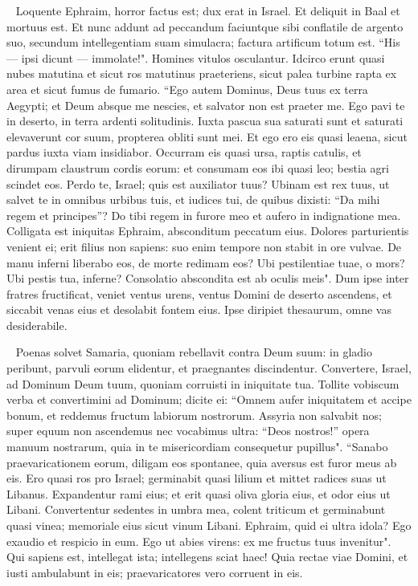 \begin{biblechapter}   
\verse Loquente Ephraim, horror factus est; dux erat in Israel. Et deliquit in Baal et mortuus est. 
\verse Et nunc addunt ad peccandum faciuntque sibi conflatile de argento suo, secundum intellegentiam suam simulacra; factura artificum totum est. “His — ipsi dicunt — immolate!". Homines vitulos osculantur. 
\verse Idcirco erunt quasi nubes matutina et sicut ros matutinus praeteriens, sicut palea turbine rapta ex area et sicut fumus de fumario. 
\verse “Ego autem Dominus, Deus tuus ex terra Aegypti; et Deum absque me nescies, et salvator non est praeter me. 
\verse Ego pavi te in deserto, in terra ardenti solitudinis. 
\verse Iuxta pascua sua saturati sunt et saturati elevaverunt cor suum, propterea obliti sunt mei. 
\verse Et ego ero eis quasi leaena, sicut pardus iuxta viam insidiabor. 
\verse Occurram eis quasi ursa, raptis catulis, et dirumpam claustrum cordis eorum: et consumam eos ibi quasi leo; bestia agri scindet eos. 
\verse Perdo te, Israel; quis est auxiliator tuus? 
\verse Ubinam est rex tuus, ut salvet te in omnibus urbibus tuis, et iudices tui, de quibus dixisti: “Da mihi regem et principes”? 
\verse Do tibi regem in furore meo et aufero in indignatione mea. 
\verse Colligata est iniquitas Ephraim, absconditum peccatum eius. 
\verse Dolores parturientis venient ei; erit filius non sapiens: suo enim tempore non stabit in ore vulvae. 
\verse De manu inferni liberabo eos, de morte redimam eos? Ubi pestilentiae tuae, o mors? Ubi pestis tua, inferne? Consolatio abscondita est ab oculis meis". 
\verse Dum ipse inter fratres fructificat, veniet ventus urens, ventus Domini de deserto ascendens, et siccabit venas eius et desolabit fontem eius. Ipse diripiet thesaurum, omne vas desiderabile. 
\end{biblechapter}

\begin{biblechapter}   
\verse Poenas solvet Samaria, quoniam rebellavit contra Deum suum: in gladio peribunt, parvuli eorum elidentur, et praegnantes discindentur. 
\verse Convertere, Israel, ad Dominum Deum tuum, quoniam corruisti in iniquitate tua. 
\verse Tollite vobiscum verba et convertimini ad Dominum; dicite ei: “Omnem aufer iniquitatem et accipe bonum, et reddemus fructum labiorum nostrorum. 
\verse Assyria non salvabit nos; super equum non ascendemus nec vocabimus ultra: “Deos nostros!” opera manuum nostrarum, quia in te misericordiam consequetur pupillus". 
\verse “Sanabo praevaricationem eorum, diligam eos spontanee, quia aversus est furor meus ab eis. 
\verse Ero quasi ros pro Israel; germinabit quasi lilium et mittet radices suas ut Libanus. 
\verse Expandentur rami eius; et erit quasi oliva gloria eius, et odor eius ut Libani. 
\verse Convertentur sedentes in umbra mea, colent triticum et germinabunt quasi vinea; memoriale eius sicut vinum Libani. 
\verse Ephraim, quid ei ultra idola? Ego exaudio et respicio in eum. Ego ut abies virens: ex me fructus tuus invenitur". 
\verse Qui sapiens est, intellegat ista; intellegens sciat haec! Quia rectae viae Domini, et iusti ambulabunt in eis; praevaricatores vero corruent in eis.
\end{biblechapter}
